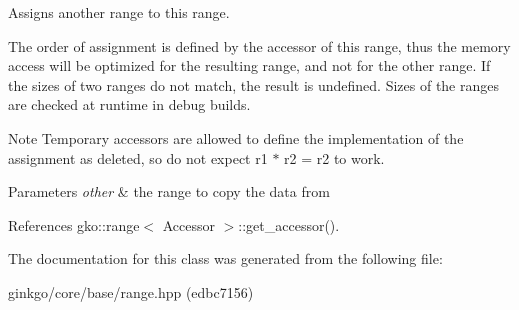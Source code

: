Assigns another range to this range. 

The order of assignment is defined by the accessor of this range, thus the memory access will be optimized for the resulting range, and not for the other range. If the sizes of two ranges do not match, the result is undefined. Sizes of the ranges are checked at runtime in debug builds.

\begin{DoxyNote}{Note}
Temporary accessors are allowed to define the implementation of the assignment as deleted, so do not expect {\ttfamily r1 $\ast$ r2 = r2} to work.
\end{DoxyNote}

\begin{DoxyParams}{Parameters}
{\em other} & the range to copy the data from \\
\hline
\end{DoxyParams}


References gko\+::range$<$ Accessor $>$\+::get\+\_\+accessor().



The documentation for this class was generated from the following file\+:\begin{DoxyCompactItemize}
\item 
ginkgo/core/base/range.\+hpp (edbc7156)\end{DoxyCompactItemize}
